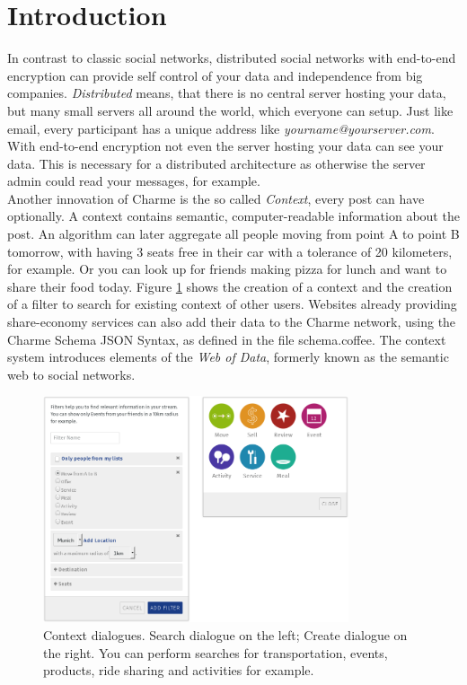 \documentclass{scrartcl}
\begin{document}
\newpage
\section{Introduction}
In contrast to classic social networks, distributed social networks with end-to-end encryption can provide self control of your data and  independence from big companies.  \textit{Distributed} means, that there is no central server hosting your data, but many small servers all around the world, which everyone can  setup. Just like email, every participant has a unique address like \textit{yourname@yourserver.com}. With end-to-end encryption not even the server hosting your data can see your data. This is necessary for a distributed architecture as otherwise the server admin could read your messages, for example.\\

Another innovation of Charme is the so called \textit{Context}, every post can have optionally. A context contains semantic, computer-readable information about the post.
 An algorithm can later aggregate all people moving from point A to point B tomorrow, with having 3 seats free in their car with a tolerance of 20 kilometers, for example. Or you can look up for friends making pizza for lunch and want to share their food today. Figure \ref{figContext} shows the creation of a context and the creation of a filter to search for existing context of other users. 
 Websites already providing share-economy services can also add their data to the Charme network, using the Charme Schema JSON Syntax, as defined in the file schema.coffee. The context system introduces elements of the \textit{Web of Data}, formerly known as the semantic web to social networks.

\begin{figure}[ht]
	\centering
  \includegraphics[width=90mm]{illustrations/context.jpg}
	\caption{Context dialogues. Search dialogue on the left; Create dialogue on the right. You can perform searches for transportation, events, products, ride sharing and activities for example.}
	\label{figContext}
\end{figure}
\newpage
\end{document}
